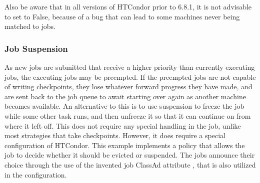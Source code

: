 Also be aware that in all versions of HTCondor prior to 6.8.1, it is
not advisable to set  to False,
because of a bug that can lead to some machines never being
matched to jobs.

\subsubsection{\label{sec:Job-Suspension}Job Suspension}
As new jobs are submitted that receive a higher priority than
currently executing jobs,
the executing jobs may be preempted.
If the preempted jobs are not capable of writing checkpoints,
they lose whatever forward progress they have made,
and are sent back to the job queue to await starting over again as
another machine becomes available.
An alternative to this is to use suspension to freeze the job while some
other task runs,
and then unfreeze it so that it can continue on from where it left off.
This does not require any special handling in the job,
unlike most strategies that take checkpoints.
However, it does require a special configuration of HTCondor.
This example implements a policy that allows the job to decide
whether it should be evicted or suspended.
The jobs announce their choice through the use of the invented
job ClassAd attribute ,
that is also utilized in the configuration.

